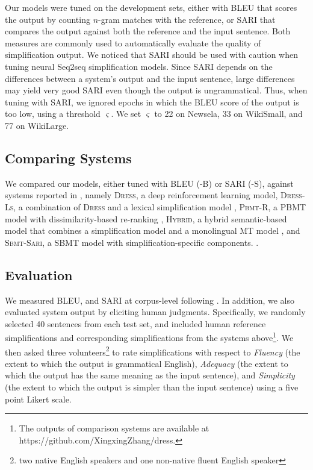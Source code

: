 \documentclass[11pt,a4paper]{article}
\begin{document}
 Our models were tuned on the development sets, either with BLEU \cite{Papineni:02} that scores the output by counting $n$-gram matches with the reference, or SARI \cite{Xu:16} that compares the output against both the reference and the input sentence. Both measures are commonly used to automatically evaluate the quality of simplification output. 
We noticed that SARI should be used with caution when tuning neural Seq2seq simplification models. Since SARI depends on the differences between a system's output and the input sentence, large differences may yield very good SARI even though the output is ungrammatical. Thus, when tuning with SARI, we ignored epochs in which the BLEU score of the output is too low, using a threshold $\varsigma$. We set $\varsigma$ to 22 on Newsela, 33 on WikiSmall, and 77 on WikiLarge. \subsection{Comparing Systems}
We compared our models, either tuned with BLEU (-\textsc{B}) or SARI (-\textsc{S}), against systems reported in \cite{Zhang:17}, namely \textsc{Dress}, a deep reinforcement learning model, \textsc{Dress-Ls}, a combination of \textsc{Dress} and a lexical simplification model \cite{Zhang:17}, \textsc{Pbmt-R}, a PBMT model with dissimilarity-based re-ranking \cite{Wubben:12}, \textsc{Hybrid}, a hybrid semantic-based model that combines a simplification model and a monolingual MT model \cite{Narayan:14}, and \textsc{Sbmt-Sari}, a SBMT model with simplification-specific components. \cite{Xu:16}. \subsection{Evaluation}
We measured BLEU, and SARI at corpus-level following \cite{Zhang:17}. In addition, we also evaluated system output by eliciting human judgments. Specifically, we randomly selected 40 sentences from each test set, and included human reference simplifications and corresponding simplifications from the systems above\footnote{The outputs of comparison systems are available at https://github.com/XingxingZhang/dress.}. We then asked three volunteers\footnote{two native English speakers and one non-native fluent English speaker} to rate simplifications with respect to \textit{Fluency} (the extent to which the output is grammatical English), \textit{Adequacy} (the extent to which the output has the same meaning as the input sentence), and \textit{Simplicity} (the extent to which the output is simpler than the input sentence) using a five point Likert scale.
\end{document}
